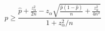 

\[
p \ge \frac{\hat{p} + \frac{z_{\alpha}^{2}}{2n} - z_{\alpha}\sqrt{\frac{\hat{p}(1-\hat{p})}{n} + \frac{z_{\alpha}^{2}}{4n^2}}} {1 + z_{\alpha}^{2}/n}
\]


